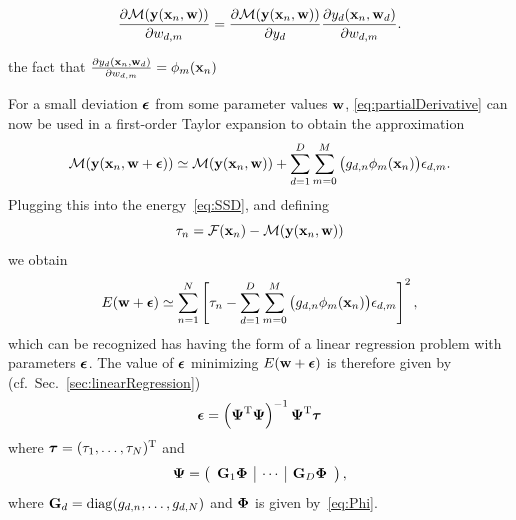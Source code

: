 \documentclass[10pt,twoside]{book}
\begin{document}
$$
\frac{\partial \mathcal{M}( \mathbf{y}( \mathbf{x}_n, \mathbf{w} ) )}{\partial w_{d,m}}
=
\frac{\partial \mathcal{M}( \mathbf{y}( \mathbf{x}_n, \mathbf{w} ) )}{\partial y_d}
\frac{\partial y_d( \mathbf{x}_n, \mathbf{w}_d )}{\partial w_{d,m}}
.
$$

the fact that $\frac{\partial y_d( \mathbf{x}_n, \mathbf{w}_d )}{\partial w_{d,m}} = \phi_m( \mathbf{x}_n )$
\fi

For a small deviation ${\mbox{\boldmath {${\epsilon}$}}}$ from some parameter values $\mathbf{w}$, 
\eqref{eq:partialDerivative} can now be used in a first-order Taylor expansion to obtain the approximation
\begin{equation}
\mathcal{M}( \mathbf{y}( \mathbf{x}_n, \mathbf{w}+{\mbox{\boldmath {${\epsilon}$}}} ) ) 
\simeq
\mathcal{M}( \mathbf{y}( \mathbf{x}_n, \mathbf{w} ) ) 
+ 
\sum_{d=1}^D \sum_{m=0}^M \big( g_{d,n} \phi_m( \mathbf{x}_n ) \big) \epsilon_{d,m}
.
\label{eq:taylor}
\end{equation}
Plugging this into the energy~\eqref{eq:SSD},
and defining 
$$
\tau_n = \mathcal{F}( \mathbf{x}_n ) - \mathcal{M}( \mathbf{y}( \mathbf{x}_n, \mathbf{w} ) )
$$
we obtain
$$
E( \mathbf{w} + {\mbox{\boldmath {${\epsilon}$}}} )
\simeq
\sum_{n=1}^N
\left[
\tau_n - \sum_{d=1}^D \sum_{m=0}^M \big( g_{d,n} \phi_m( \mathbf{x}_n ) \big) \epsilon_{d,m}
\right]^2
,
$$
which can be recognized has having the form of a linear regression problem with parameters 
${\mbox{\boldmath {${\epsilon}$}}}$.
The value of ${\mbox{\boldmath {${\epsilon}$}}}$ minimizing $E(\mathbf{w} + {\mbox{\boldmath {${\epsilon}$}}})$
is therefore given by (cf.~Sec.~\ref{sec:linearRegression})
\begin{equation}
{\mbox{\boldmath {${\epsilon}$}}}
=
\left( 
{\mbox{\boldmath {${\Psi}$}}}^\mathrm{T} {\mbox{\boldmath {${\Psi}$}}}
\right)^{-1}
{\mbox{\boldmath {${\Psi}$}}}^\mathrm{T}
{\mbox{\boldmath {${\tau}$}}}
\label{eq:GaussNewton}
\end{equation}
where 
$
{\mbox{\boldmath {${\tau}$}}} = (\tau_1, \ldots, \tau_N)^\mathrm{T}
$
and 
$$
{\mbox{\boldmath {${\Psi}$}}} =
\left(
\begin{array}{c|c|c}
\mathbf{G}_1 {\mbox{\boldmath {${\Phi}$}}}
&
\cdots 
&
\mathbf{G}_D {\mbox{\boldmath {${\Phi}$}}}
\end{array}
\right)
,
$$
where 
$\mathbf{G}_d = \mathrm{diag}( g_{d,n}, \ldots, g_{d,N} )$
and 
${\mbox{\boldmath {${\Phi}$}}}$ is given by~\eqref{eq:Phi}.
\end{document}
